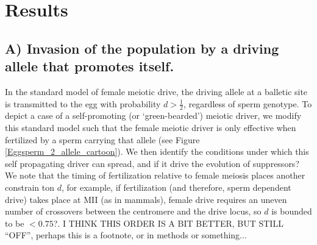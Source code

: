 \documentclass[12pt,letterpaper]{article}
\newcommand{\yb}[1]{{ \color{blue} #1}}
\begin{document}
\section*{Results}

\subsection*{ A) Invasion of the population by a driving allele that promotes
itself.}

In the standard model of female meiotic drive, the driving allele at a balletic site is transmitted to the egg with probability  $d > \frac{1}{2}$, regardless of sperm genotype. 
To depict a case of a self-promoting (or `green-bearded') meiotic driver,  we modify this standard model such that the female meiotic driver is only effective when fertilized by a sperm carrying that allele (see Figure \ref{Eggsperm_2_allele_cartoon}).
We then identify the conditions under which this self propagating driver can spread, and if it drive the evolution of suppressors? 
We note that the timing of fertilization relative to female meiosis places another constrain ton $d$, 
	for example, if fertilization (and therefore, sperm dependent drive) takes place at MII (as in mammals),
	female drive requires an uneven number of crossovers between the centromere and the drive locus, 
	so $d$ is bounded to be $<0.75$?.
\yb{I THINK THIS ORDER IS A BIT BETTER, BUT STILL ``OFF'', perhaps this is a footnote, or in methods or something...}




\end{document}

